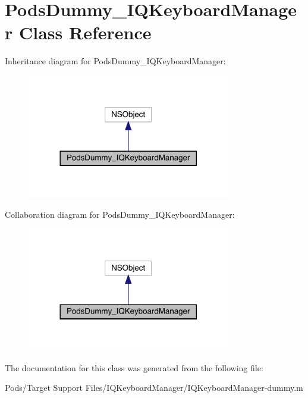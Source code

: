 \hypertarget{interface_pods_dummy___i_q_keyboard_manager}{}\section{Pods\+Dummy\+\_\+\+I\+Q\+Keyboard\+Manager Class Reference}
\label{interface_pods_dummy___i_q_keyboard_manager}


Inheritance diagram for Pods\+Dummy\+\_\+\+I\+Q\+Keyboard\+Manager\+:\nopagebreak
\begin{figure}[H]
\begin{center}
\leavevmode
\includegraphics[width=252pt]{interface_pods_dummy___i_q_keyboard_manager__inherit__graph}
\end{center}
\end{figure}


Collaboration diagram for Pods\+Dummy\+\_\+\+I\+Q\+Keyboard\+Manager\+:\nopagebreak
\begin{figure}[H]
\begin{center}
\leavevmode
\includegraphics[width=252pt]{interface_pods_dummy___i_q_keyboard_manager__coll__graph}
\end{center}
\end{figure}


The documentation for this class was generated from the following file\+:\begin{DoxyCompactItemize}
\item 
Pods/\+Target Support Files/\+I\+Q\+Keyboard\+Manager/I\+Q\+Keyboard\+Manager-\/dummy.\+m\end{DoxyCompactItemize}
